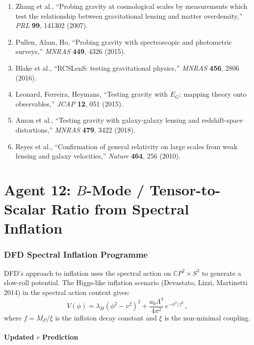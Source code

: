 \documentclass[11pt,a4paper]{article}
\newcommand{\CP}{\mathbb{C}P}
\begin{document}
\begin{enumerate}
\item Zhang et al., ``Probing gravity at cosmological scales by measurements which test the relationship between gravitational lensing and matter overdensity,'' \textit{PRL} \textbf{99}, 141302 (2007).
\item Pullen, Alam, Ho, ``Probing gravity with spectroscopic and photometric surveys,'' \textit{MNRAS} \textbf{449}, 4326 (2015).
\item Blake et al., ``RCSLenS: testing gravitational physics,'' \textit{MNRAS} \textbf{456}, 2806 (2016).
\item Leonard, Ferreira, Heymans, ``Testing gravity with $E_G$: mapping theory onto observables,'' \textit{JCAP} \textbf{12}, 051 (2015).
\item Amon et al., ``Testing gravity with galaxy-galaxy lensing and redshift-space distortions,'' \textit{MNRAS} \textbf{479}, 3422 (2018).
\item Reyes et al., ``Confirmation of general relativity on large scales from weak lensing and galaxy velocities,'' \textit{Nature} \textbf{464}, 256 (2010).
\end{enumerate}


\part{Agent 12: $B$-Mode / Tensor-to-Scalar Ratio from Spectral Inflation}
\label{part:Bmode}

\section{DFD Spectral Inflation Programme}

DFD's approach to inflation uses the spectral action on $\CP^2 \times S^3$ to generate a slow-roll potential. The Higgs-like inflation scenario (Devastato, Lizzi, Martinetti 2014) in the spectral action context gives:
\begin{equation}
V(\phi) = \lambda_H\left(\phi^2 - v^2\right)^2 + \frac{a_0 \Lambda^4}{4\pi^2}\,e^{-\phi^2/f^2}\,,
\end{equation}
where $f = M_P/\xi$ is the inflaton decay constant and $\xi$ is the non-minimal coupling.

\subsection{Updated $r$ Prediction}
\end{document}
